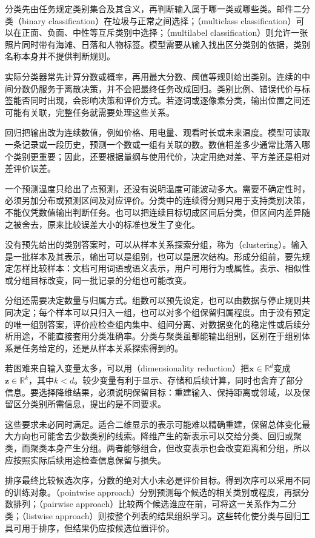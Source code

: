 分类先由任务规定类别集合及其含义，再判断输入属于哪一类或哪些类。邮件二分类（binary classification）在垃圾与正常之间选择；（multiclass classification）可以在正面、负面、中性等互斥类别中选择；（multilabel classification）则允许一张照片同时带有海滩、日落和人物标签。模型需要从输入找出区分类别的依据，类别名称本身并不提供判断规则。

实际分类器常先计算分数或概率，再用最大分数、阈值等规则给出类别。连续的中间分数仍服务于离散决策，并不会把最终任务改成回归。类别比例、错误代价与标签能否同时出现，会影响决策和评价方式。若逐词或逐像素分类，输出位置之间还可能有关联，完整任务就需要处理这些关系。

回归把输出改为连续数值，例如价格、用电量、观看时长或未来温度。模型可读取一条记录或一段历史，预测一个数或一组有关联的数。数值相差多少通常比落入哪个类别更重要；因此，还要根据量纲与使用代价，决定用绝对差、平方差还是相对差评价误差。

一个预测温度只给出了点预测，还没有说明温度可能波动多大。需要不确定性时，必须另加分布或预测区间及对应评价。分类中的连续得分则只用于支持类别决策，不能仅凭数值输出判断任务。也可以把连续目标切成区间后分类，但区间内差异随之被舍去，原来比较误差大小的标准也发生了变化。

没有预先给出的类别答案时，可以从样本关系探索分组，称为（clustering）。输入是一批样本及其表示，输出可以是组别，也可以是层次结构。形成分组前，要先规定怎样比较样本：文档可用词语或语义表示，用户可用行为或属性。表示、相似性或分组目标改变，同一批记录的分组也可能改变。

分组还需要决定数量与归属方式。组数可以预先设定，也可以由数据与停止规则共同决定；每个样本可以只归入一组，也可以对多个组保留归属程度。由于没有预定的唯一组别答案，评价应检查组内集中、组间分离、对数据变化的稳定性或后续分析用途，不能直接套用分类准确率。分类与聚类虽都能输出组别，区别在于组别体系是任务给定的，还是从样本关系探索得到的。

若困难来自输入变量太多，可以用（dimensionality reduction）把$\bm x\in\mathbb R^d$变成$\bm z\in\mathbb R^k$，其中$k<d$。较少变量有利于显示、存储和后续计算，同时也舍弃了部分信息。要选择降维结果，必须说明保留目标：重建输入、保持距离或邻域，以及保留区分类别所需信息，提出的是不同要求。

这些要求未必同时满足。适合二维显示的表示可能难以精确重建，保留总体变化最大方向也可能舍去少数类别的线索。降维产生的新表示可以交给分类、回归或聚类，而聚类本身产生分组。两者能够组合，但改变表示也会改变距离和分组，所以应按照实际后续用途检查信息保留与损失。

排序最终比较候选次序，分数的绝对大小未必是评价目标。得到次序可以采用不同的训练对象。（pointwise approach）分别预测每个候选的相关类别或程度，再据分数排列；（pairwise approach）比较两个候选谁应在前，可将这一关系作为二分类；（listwise approach）则按整个列表的结果组织学习。这些转化使分类与回归工具可用于排序，但结果仍应按候选位置评价。

